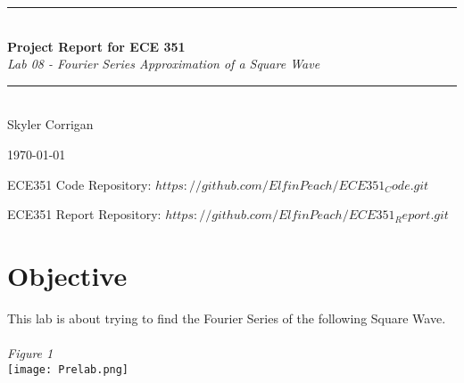 \documentclass[12pt,a4paper]{article}
\newcommand{\HRule}{\rule{\linewidth}{0.5mm}}
\begin{document}
\begin{titlepage}
\begin{center}



\HRule \\[0.4cm]
{ \LARGE 
  \textbf{Project Report for ECE 351}\\[0.4cm]
  \emph{Lab 08 - Fourier Series Approximation of a Square Wave}\\[0.4cm]
}
\HRule \\[1.5cm]



{ \large
  Skyler Corrigan \\[0.1cm]
}

\vfill



{\large \today}

{ \large
ECE351 Code Repository: 
\hyperlink{$https://github.com/ElfinPeach/ECE351_Code.git$}{$https://github.com/ElfinPeach/ECE351_Code.git$}

ECE351 Report Repository: 
\hyperlink{$https://github.com/ElfinPeach/ECE351_Report.git$}{$https://github.com/ElfinPeach/ECE351_Report.git$}
}
 
\end{center}
\end{titlepage}


\newpage

\tableofcontents
{}
\newpage
\setcounter{page}{1}

\section{Objective}
This lab is about trying to find the Fourier Series of the following Square Wave.\\
\\
\textit{Figure 1}
\\
\texttt{[image: Prelab.png]}
\\
\end{document}

